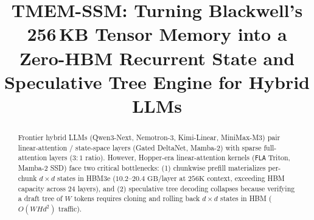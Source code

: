 \documentclass[conference,10pt]{IEEEtran}
\title{TMEM-SSM: Turning Blackwell's 256\,KB Tensor Memory into a Zero-HBM Recurrent State and Speculative Tree Engine for Hybrid LLMs}
\author{\IEEEauthorblockN{Rishi Vinodkumar}}
\begin{document}
\maketitle

\begin{abstract}
Frontier hybrid LLMs (Qwen3-Next, Nemotron-3, Kimi-Linear, MiniMax-M3) pair linear-attention / state-space layers (Gated DeltaNet, Mamba-2) with sparse full-attention layers ($3{:}1$ ratio). However, Hopper-era linear-attention kernels (\texttt{FLA} Triton, Mamba-2 SSD) face two critical bottlenecks: (1) chunkwise prefill materializes per-chunk $d{\times}d$ states in HBM3e ($10.2$--$20.4\text{ GB}$/layer at $256\text{K}$ context, exceeding HBM capacity across $24$ layers), and (2) speculative tree decoding collapses because verifying a draft tree of $W$ tokens requires cloning and rolling back $d{\times}d$ states in HBM ($O(W H d^2)$ traffic).


\end{abstract}
\end{document}
